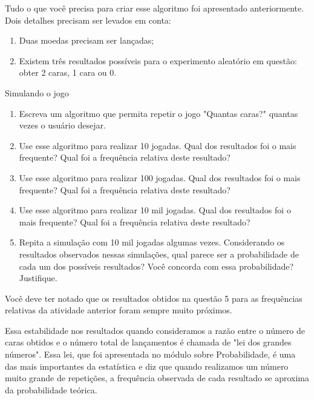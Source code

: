 Tudo o que você precisa para criar esse algoritmo foi apresentado anteriormente. Dois detalhes precisam ser levados em conta:

\begin{enumerate}[label=\titem{\arabic*}]
\item Duas moedas precisam ser lançadas;
\item Existem três resultados possíveis para o experimento aleatório em questão: obter 2 caras, 1 cara ou 0.
\end{enumerate}

\begin{task}{Simulando o jogo}
\begin{enumerate}
\item Escreva um algoritmo que permita repetir o jogo "Quantas caras?"{} quantas vezes o usuário desejar.

\item Use esse algoritmo para realizar 10 jogadas. Qual dos resultados foi o mais frequente? Qual foi a frequência relativa deste resultado?

\item Use esse algoritmo para realizar 100 jogadas. Qual dos resultados foi o mais frequente? Qual foi a frequência relativa deste resultado?

\item Use esse algoritmo para realizar 10 mil jogadas. Qual dos resultados foi o mais frequente? Qual foi a frequência relativa deste resultado?

\item Repita a simulação com 10 mil jogadas algumas vezes. Considerando os resultados observados nessas simulações, qual parece ser a probabilidade de cada um dos possíveis resultados? Você concorda com essa probabilidade? Justifique.
\end{enumerate}
\end{task}

\label{comp-arr9}

Você deve ter notado que os resultados obtidos na questão 5 para as frequências relativas da atividade anterior foram sempre muito próximos.

Essa estabilidade nos resultados quando consideramos a razão entre o número de caras obtidos e o número total de lançamentos é chamada de "lei dos grandes números". Essa lei, que foi apresentada no módulo sobre Probabilidade, é uma das mais importantes da estatística e diz que quando realizamos um número muito grande de repetições, a frequência observada de cada resultado se aproxima da probabilidade teórica.

